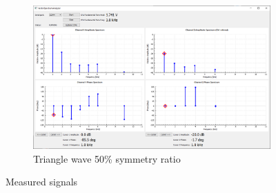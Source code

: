 \documentclass[notitlepage, a4paper, 11pt]{article}
\begin{document}
\begin{figure}[H]
\begin{subfigure}[][][t]{0.45\textwidth}
			\includegraphics[width=\textwidth, trim=10 80 10 100, clip]{../img/Circuit2/trig40}
			\caption{Triangle wave 50\% symmetry ratio}
		\end{subfigure}
		\caption{Measured signals}
		\label{fig:pure-signals}
	\end{figure}
	
\end{document}
